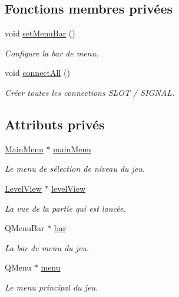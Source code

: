 \subsection*{Fonctions membres privées}
\begin{DoxyCompactItemize}
\item 
void \hyperlink{classMainWindow_a306206f30c08b874636f48ed79192e86}{set\+Menu\+Bar} ()
\begin{DoxyCompactList}\small\item\em Configure la bar de menu. \end{DoxyCompactList}\item 
void \hyperlink{classMainWindow_a870e523fc13b85f707e938bea8e91fd3}{connect\+All} ()
\begin{DoxyCompactList}\small\item\em Créer toutes les connections S\+L\+O\+T / S\+I\+G\+N\+A\+L. \end{DoxyCompactList}\end{DoxyCompactItemize}
\subsection*{Attributs privés}
\begin{DoxyCompactItemize}
\item 
\hyperlink{classMainMenu}{Main\+Menu} $\ast$ \hyperlink{classMainWindow_acff78d8b40fc6a64c3503e9fcf120df2}{main\+Menu}
\begin{DoxyCompactList}\small\item\em Le menu de sélection de niveau du jeu. \end{DoxyCompactList}\item 
\hyperlink{classLevelView}{Level\+View} $\ast$ \hyperlink{classMainWindow_a62681b0c049afcba55ffbd5e5f470ca3}{level\+View}
\begin{DoxyCompactList}\small\item\em La vue de la partie qui est lancée. \end{DoxyCompactList}\item 
Q\+Menu\+Bar $\ast$ \hyperlink{classMainWindow_af362dbdd2f874d380a02700ce5dbe42c}{bar}
\begin{DoxyCompactList}\small\item\em La bar de menu du jeu. \end{DoxyCompactList}\item 
Q\+Menu $\ast$ \hyperlink{classMainWindow_a42e15f7cdb120e053ef72a06d11d73f6}{menu}
\begin{DoxyCompactList}\small\item\em Le menu principal du jeu. \end{DoxyCompactList}\end{DoxyCompactItemize}


